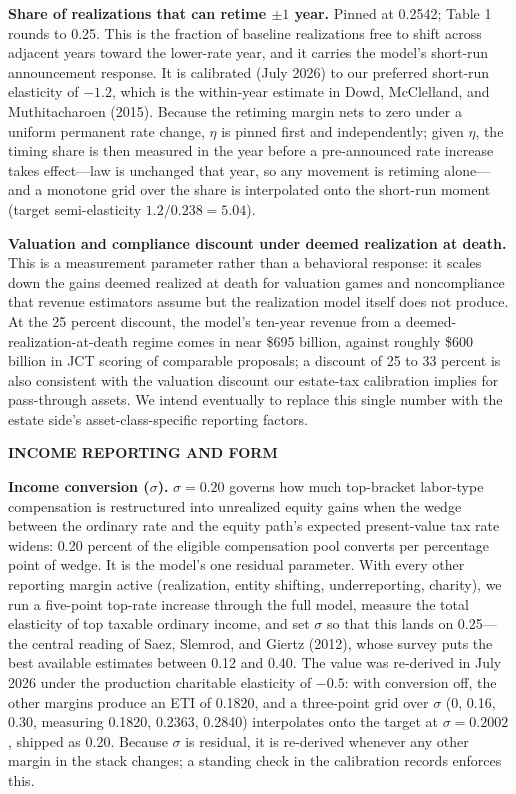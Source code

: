 \documentclass[10pt,twocolumn]{article}
\begin{document}
\textbf{Share of realizations that can retime $\pm 1$ year.} Pinned at 0.2542;
Table 1 rounds to 0.25. This is the fraction of baseline realizations free to
shift across adjacent years toward the lower-rate year, and it carries the
model's short-run announcement response. It is calibrated (July 2026) to our
preferred short-run elasticity of $-1.2$, which is the within-year estimate in
Dowd, McClelland, and Muthitacharoen (2015). Because the retiming margin nets
to zero under a uniform permanent rate change, $\eta$ is pinned first and
independently; given $\eta$, the timing share is then measured in the year
before a pre-announced rate increase takes effect---law is unchanged that
year, so any movement is retiming alone---and a monotone grid over the share
is interpolated onto the short-run moment (target semi-elasticity
$1.2/0.238 = 5.04$).

\textbf{Valuation and compliance discount under deemed realization at death.}
This is a measurement parameter rather than a behavioral response: it scales
down the gains
deemed realized at death for valuation games and noncompliance that revenue
estimators assume but the realization model itself does not produce. At the 25
percent discount, the model's ten-year revenue from a
deemed-realization-at-death regime comes in near \$695 billion, against
roughly \$600 billion in JCT scoring of comparable proposals; a discount of 25
to 33 percent is also consistent with the valuation discount our estate-tax
calibration implies for pass-through assets. We intend eventually to replace
this single number with the estate side's asset-class-specific reporting
factors.

\medskip\noindent\textbf{\small INCOME REPORTING AND FORM}

\textbf{Income conversion ($\sigma$).} $\sigma = 0.20$ governs how much
top-bracket labor-type compensation is restructured into unrealized equity
gains when the wedge between the ordinary rate and the equity path's expected
present-value tax rate widens: 0.20 percent of the eligible compensation pool
converts per percentage point of wedge. It is the model's one residual
parameter. With every other reporting margin active (realization, entity
shifting, underreporting, charity), we run a five-point top-rate increase
through the full model, measure the total elasticity of top taxable ordinary
income, and set $\sigma$ so that this lands on 0.25---the central reading of
Saez, Slemrod, and Giertz (2012), whose survey puts the best available
estimates between 0.12 and 0.40. The value was re-derived in July 2026 under the production charitable
elasticity of $-0.5$: with conversion off, the other margins produce an ETI of
0.1820, and a three-point grid over $\sigma$ (0, 0.16, 0.30, measuring 0.1820,
0.2363, 0.2840) interpolates onto the target at $\sigma = 0.2002$, shipped as
0.20.
Because $\sigma$ is residual, it is re-derived whenever any other margin in
the stack changes; a standing check in the calibration records enforces this.
\end{document}
